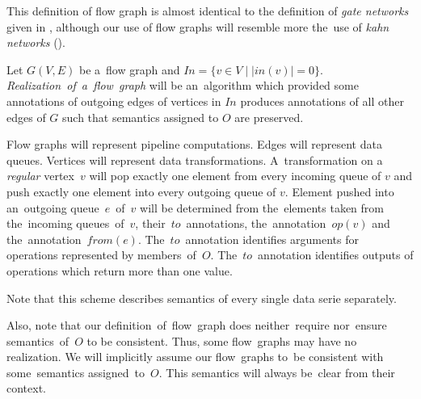   This definition of flow graph is almost identical to the definition of \emph{gate networks} given in \cite{ads}, although our use of flow graphs will resemble more the~use of \emph{kahn networks} (\cite{asdfe}).

\begin{define}
  Let $G(V,E)$ be a~flow graph and ${In = \{v \in V \mid |in(v)| = 0\}}$. \emph{Realization~of~a~flow~graph} will be an~algorithm which provided some annotations of outgoing edges of vertices in $In$ produces annotations of all other edges of $G$ such that semantics assigned to $O$ are preserved. 
\end{define}

  Flow graphs will represent pipeline computations. Edges will represent data queues. Vertices will represent data transformations. A~transformation on a \emph{regular} vertex~$v$ will pop exactly one element from every incoming queue of $v$ and push exactly one element into every outgoing queue of $v$. Element pushed into an~outgoing queue~$e$~of~$v$ will be determined from the~elements taken from the~incoming queues~of~$v$, their~$to$~annotations, the~annotation~$op(v)$ and the~annotation~$from(e)$. The~$to$~annotation identifies arguments for operations represented by members~of~$O$. The~$to$~annotation identifies outputs of operations which return more than one value.

\parspace

Note that this scheme describes semantics of every single data serie separately. 

\parspace

Also, note that our definition~of~flow~graph does neither~require nor~ensure semantics~of~$O$ to be consistent. Thus, some flow~graphs may have no realization. We will implicitly assume our flow~graphs to~be consistent with some~semantics assigned~to~$O$. This semantics will always be~clear from their context.


